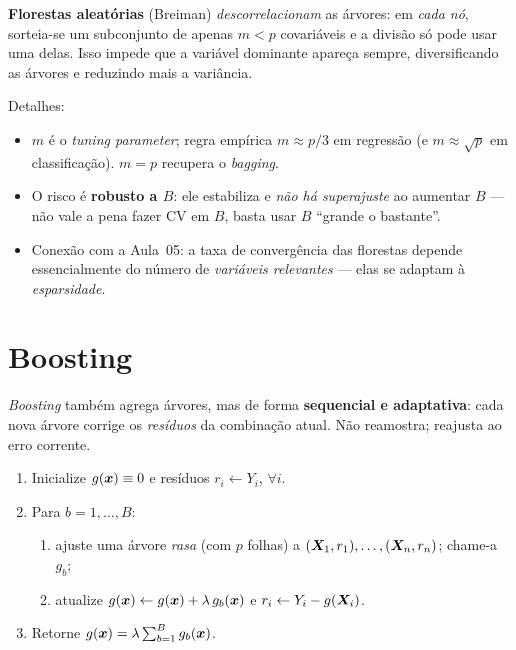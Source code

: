 \documentclass[11pt,a4paper]{article}
\begin{document}
\begin{ideia}
\textbf{Florestas aleatórias} (Breiman) \emph{descorrelacionam} as árvores: em
\emph{cada nó}, sorteia-se um subconjunto de apenas $m<p$ covariáveis e a divisão
só pode usar uma delas. Isso impede que a variável dominante apareça sempre,
diversificando as árvores e reduzindo mais a variância.
\end{ideia}

\noindent Detalhes:
\begin{itemize}[leftmargin=1.4cm,nosep]
  \item $m$ é o \emph{tuning parameter}; regra empírica $m\approx p/3$ em regressão
        (e $m\approx\sqrt p$ em classificação). $m=p$ recupera o \emph{bagging}.
  \item O risco é \textbf{robusto a $B$}: ele estabiliza e \emph{não há
        superajuste} ao aumentar $B$ --- não vale a pena fazer CV em $B$, basta
        usar $B$ ``grande o bastante''.
  \item Conexão com a Aula~05: a taxa de convergência das florestas depende
        essencialmente do número de \emph{variáveis relevantes} --- elas se adaptam
        à \emph{esparsidade}.
\end{itemize}

\section{Boosting}
\emph{Boosting} também agrega árvores, mas de forma \textbf{sequencial e
adaptativa}: cada nova árvore corrige os \emph{resíduos} da combinação atual. Não
reamostra; reajusta ao erro corrente.

\begin{tcolorbox}[colback=cinzaclaro,colframe=azulufrj,title={Algoritmo (boosting de árvores para regressão)}]
\begin{enumerate}[leftmargin=1.4cm,nosep]
  \item Inicialize $g(\bm{x})\equiv 0$ e resíduos $r_i \leftarrow Y_i$, $\forall i$.
  \item Para $b=1,\dots,B$:
    \begin{enumerate}[label=(\alph*),nosep]
      \item ajuste uma árvore \emph{rasa} (com $p$ folhas) a
            $(\bm{X}_1,r_1),\dots,(\bm{X}_n,r_n)$; chame-a $g_b$;
      \item atualize $g(\bm{x})\leftarrow g(\bm{x})+\lambda\,g_b(\bm{x})$ e
            $r_i\leftarrow Y_i-g(\bm{X}_i)$.
    \end{enumerate}
  \item Retorne $g(\bm{x})=\lambda\sum_{b=1}^B g_b(\bm{x})$.
\end{enumerate}
\end{tcolorbox}
\end{document}
